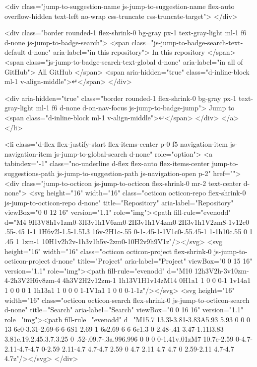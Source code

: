     <div class="jump-to-suggestion-name js-jump-to-suggestion-name flex-auto overflow-hidden text-left no-wrap css-truncate css-truncate-target">
    </div>

    <div class="border rounded-1 flex-shrink-0 bg-gray px-1 text-gray-light ml-1 f6 d-none js-jump-to-badge-search">
      <span class="js-jump-to-badge-search-text-default d-none" aria-label="in this repository">
        In this repository
      </span>
      <span class="js-jump-to-badge-search-text-global d-none" aria-label="in all of GitHub">
        All GitHub
      </span>
      <span aria-hidden="true" class="d-inline-block ml-1 v-align-middle">↵</span>
    </div>

    <div aria-hidden="true" class="border rounded-1 flex-shrink-0 bg-gray px-1 text-gray-light ml-1 f6 d-none d-on-nav-focus js-jump-to-badge-jump">
      Jump to
      <span class="d-inline-block ml-1 v-align-middle">↵</span>
    </div>
  </a>
</li>

  

<li class="d-flex flex-justify-start flex-items-center p-0 f5 navigation-item js-navigation-item js-jump-to-global-search d-none" role="option">
  <a tabindex="-1" class="no-underline d-flex flex-auto flex-items-center jump-to-suggestions-path js-jump-to-suggestion-path js-navigation-open p-2" href="">
    <div class="jump-to-octicon js-jump-to-octicon flex-shrink-0 mr-2 text-center d-none">
      <svg height="16" width="16" class="octicon octicon-repo flex-shrink-0 js-jump-to-octicon-repo d-none" title="Repository" aria-label="Repository" viewBox="0 0 12 16" version="1.1" role="img"><path fill-rule="evenodd" d="M4 9H3V8h1v1zm0-3H3v1h1V6zm0-2H3v1h1V4zm0-2H3v1h1V2zm8-1v12c0 .55-.45 1-1 1H6v2l-1.5-1.5L3 16v-2H1c-.55 0-1-.45-1-1V1c0-.55.45-1 1-1h10c.55 0 1 .45 1 1zm-1 10H1v2h2v-1h3v1h5v-2zm0-10H2v9h9V1z"/></svg>
      <svg height="16" width="16" class="octicon octicon-project flex-shrink-0 js-jump-to-octicon-project d-none" title="Project" aria-label="Project" viewBox="0 0 15 16" version="1.1" role="img"><path fill-rule="evenodd" d="M10 12h3V2h-3v10zm-4-2h3V2H6v8zm-4 4h3V2H2v12zm-1 1h13V1H1v14zM14 0H1a1 1 0 0 0-1 1v14a1 1 0 0 0 1 1h13a1 1 0 0 0 1-1V1a1 1 0 0 0-1-1z"/></svg>
      <svg height="16" width="16" class="octicon octicon-search flex-shrink-0 js-jump-to-octicon-search d-none" title="Search" aria-label="Search" viewBox="0 0 16 16" version="1.1" role="img"><path fill-rule="evenodd" d="M15.7 13.3l-3.81-3.83A5.93 5.93 0 0 0 13 6c0-3.31-2.69-6-6-6S1 2.69 1 6s2.69 6 6 6c1.3 0 2.48-.41 3.47-1.11l3.83 3.81c.19.2.45.3.7.3.25 0 .52-.09.7-.3a.996.996 0 0 0 0-1.41v.01zM7 10.7c-2.59 0-4.7-2.11-4.7-4.7 0-2.59 2.11-4.7 4.7-4.7 2.59 0 4.7 2.11 4.7 4.7 0 2.59-2.11 4.7-4.7 4.7z"/></svg>
    </div>

